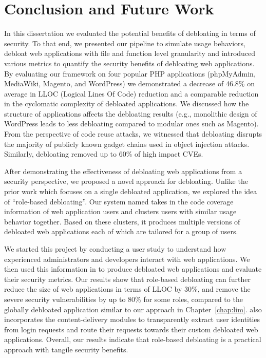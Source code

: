 \chapter{Conclusion and Future Work}
\label{chap:conclusion}

In this dissertation we evaluated the potential benefits of debloating in terms of security. 
To that end, we presented our pipeline to simulate usage behaviors, debloat web applications with file and function level granularity and introduced various metrics to quantify the security benefits of debloating web applications. 
By evaluating our framework on four popular PHP applications (phpMyAdmin, MediaWiki, Magento, and WordPress) we demonstrated a decrease of 46.8\% on average in LLOC (Logical Lines Of Code) reduction and a comparable reduction in the cyclomatic complexity of debloated applications. 
We discussed how the structure of applications affects the debloating results (e.g., monolithic design of WordPress leads to less debloating compared to modular ones such as Magento). 
From the perspective of code reuse attacks, we witnessed that debloating disrupts the majority of publicly known gadget chains used in object injection attacks. 
Similarly, debloating removed up to 60\% of high impact CVEs. 

After demonstrating the effectiveness of debloating web applications from a security perspective, we proposed a novel approach for debloating. 
Unlike the prior work which focuses on a single debloated application, we explored the idea of ``role-based debloating''. 
Our system named \dbltr{} takes in the code coverage information of web application users and clusters users with similar usage behavior together. 
Based on these clusters, it produces multiple versions of debloated web applications each of which are tailored for a group of users. 

We started this project by conducting a user study to understand how experienced administrators and developers interact with web applications. 
We then used this information in \dbltr{} to produce debloated web applications and evaluate their security metrics. 
Our results show that role-based debloating can further reduce the size of web applications in terms of LLOC by 30\%, and remove the severe security vulnerabilities by up to 80\% for some roles, compared to the globally debloated application similar to our approach in Chapter~\ref{chap:lim}. 
\dbltr{} also incorporates the content-delivery modules to transparently extract user identities from login requests and route their requests towards their custom debloated web applications. 
Overall, our results indicate that role-based debloating is a practical approach with tangile security benefits.

